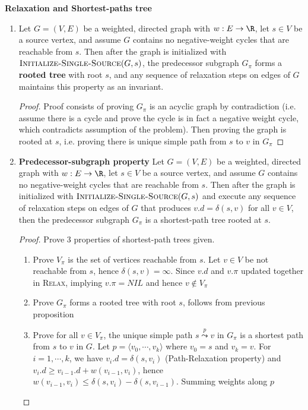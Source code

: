 \documentclass[11pt]{article}
\begin{document}
\begin{proposition*}
    \textbf{Relaxation and Shortest-paths tree}
    \begin{enumerate}
        \item Let $G = (V,E)$ be a weighted, directed graph with $w:E\to\R$, let $s\in V$ be a source vertex, and assume $G$ contains no negative-weight cycles that are reachable from $s$. Then after the graph is initialized with $\textsc{Initialize-Single-Source}(G,s)$, the predecessor subgraph $G_{\pi}$ forms a \textbf{rooted tree} with root $s$, and any sequence of relaxation steps on edges of $G$ maintains this property as an invariant.
        \begin{proof}
            Proof consists of proving $G_{\pi}$ is an acyclic graph by contradiction (i.e. assume there is a cycle and prove the cycle is in fact a negative weight cycle, which contradicts assumption of the problem). Then proving the graph is rooted at $s$, i.e. proving there is unique simple path from $s$ to $v$ in $G_{\pi}$
        \end{proof}
        \item \textbf{Predecessor-subgraph property} Let $G = (V,E)$ be a weighted, directed graph with $w:E\to\R$, let $s\in V$ be a source vertex, and assume $G$ contains no negative-weight cycles that are reachable from $s$. Then after the graph is initialized with $\textsc{Initialize-Single-Source}(G,s)$ and execute any sequence of relaxation steps on edges of $G$ that produces $v.d = \delta(s,v)$ for all $v\in V$, then the predecessor subgraph $G_{\pi}$ is a shortest-path tree rooted at $s$.
        \begin{proof}
            Prove 3 properties of shortest-path trees given.
            \begin{enumerate}
                \item Prove $V_{\pi}$ is the set of vertices reachable from $s$. 
                Let $v\in V$ be not reachable from $s$, hence $\delta(s,v) = \infty$. Since $v.d$ and $v.{\pi}$ updated together in \textsc{Relax}, implying $v.{\pi} = NIL$ and hence $v\not\in V_{\pi}$ 
                \item Prove $G_{\pi}$ forms a rooted tree with root $s$, follows from previous proposition
                \item Prove for all $v\in V_{\pi}$, the unique simple path $s \overset{p}{\leadsto} v$ in $G_{\pi}$ is a shortest path from $s$ to $v$ in $G$. Let $p = \langle v_0, \cdots, v_k \rangle$ where $v_0 = s$ and $v_k = v$. For $ i = 1,\cdots, k$, we have $v_i.d = \delta(s,v_i)$ (Path-Relaxation property) and $v_i.d \geq v_{i-1}.d + w(v_{i-1}, v_i)$, hence $w(v_{i-1}, v_i) \leq \delta(s, v_i) - \delta(s, v_{i-1})$. Summing weights along $p$

\end{enumerate}
\end{proof}
\end{enumerate}
\end{proposition*}
\end{document}
